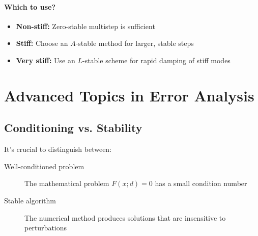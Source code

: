 \paragraph{Which to use?}
\begin{itemize}
    \item \textbf{Non-stiff:} Zero-stable multistep is sufficient
    \item \textbf{Stiff:} Choose an $A$-stable method for larger, stable steps
    \item \textbf{Very stiff:} Use an $L$-stable scheme for rapid damping of stiff modes
\end{itemize}

\section{Advanced Topics in Error Analysis}
\label{sec:advanced-topics}

\subsection{Conditioning vs. Stability}
\label{subsec:conditioning-vs-stability}

It's crucial to distinguish between:
\begin{description}
    \item[Well-conditioned problem] The mathematical problem $F(x; d) = 0$ has a small condition number
    \item[Stable algorithm] The numerical method produces solutions that are insensitive to perturbations
\end{description}

